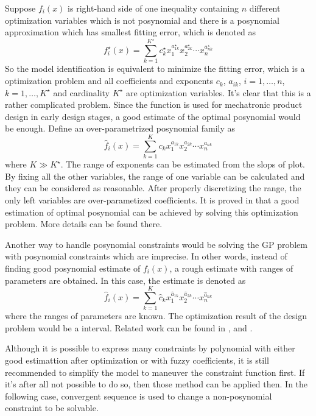Suppose $f_i(x)$ is right-hand side of one inequality containing $n$ different optimization variables which is not posynomial and there is a posynomial approximation which has smallest fitting error, which is denoted as $$f_i^\star(x)=\sum_{k=1}^{K^\star} c_k^\star x_1^{{a_{1k}^\star}}x_2^{{a_{2k}^\star}}\cdots x_n^{{a_{nk}^\star}}$$
So the model identification is equivalent to minimize the fitting error, which is a optimization problem and all coefficients and exponents $c_k$, $a_{ik}$, $i=1,\ldots,n$, $k=1,\ldots,K^\star$ and cardinality $K^\star$ are optimization variables. It's clear that this is a rather complicated problem. Since the function is used for mechatronic product design in early design stages, a good estimate of the optimal posynomial would be enough. Define an over-parametrized posynomial family as $$\hat{f}_i(x)=\sum_{k=1}^K c_k x_1^{a_{1k}}x_2^{a_{2k}}\cdots x_n^{a_{nk}}$$ where $K \gg K^\star$. The range of exponents can be estimated from the slops of plot. By fixing all the other variables, the range of one variable can be calculated and they can be considered as reasonable. After properly discretizing the range, the only left variables are over-parametized coefficients. It is proved in \cite{Posynomial2015} that a good estimation of optimal posynomial can be achieved by solving this optimization problem. More details can be found there.

Another way to handle posynomial constraints would be solving the GP problem with posynomial constraints which are imprecise. In other words, instead of finding good posynomial estimate of $f_i(x)$, a rough estimate with ranges of parameters are obtained. In this case, the estimate is denoted as $$\hat{f}_i(x)=\sum_{k=1}^K \hat{c}_{k} x_1^{\hat{a}_{1k}}x_2^{\hat{a}_{2k}}\cdots x_n^{\hat{a}_{nk}}$$ where the ranges of parameters are known. The optimization result of the design problem would be a interval. Related work can be found in \cite{liu2007geometric}, \cite{liu2009using} and \cite{mahapatra2012posynomial}.

Although it is possible to express many constraints by polynomial with either good estimattion after optimization or with fuzzy coefficients, it is still recommended to simplify the model to maneuver the constraint function first. If it's after all not possible to do so, then those method can be applied then. In the following case, convergent sequence is used to change a non-posynomial constraint to be solvable.

